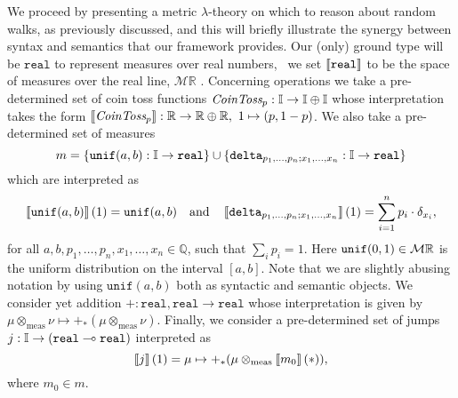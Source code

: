 We proceed by presenting a metric $\lambda$-theory on which to reason about random walks, as previously discussed, and this will briefly illustrate the synergy between syntax and semantics that our framework provides. Our (only) ground type
will be $\mathtt{real}$ to represent measures over real numbers, \ie\ we set
$\left \llbracket \mathtt{real} \right \rrbracket$ to be the space of measures over the real line, $\mathcal{M}\mathbb{R}$ .
Concerning operations we take a pre-determined set of coin toss functions $\emph{CoinToss}_p : \mathbb{I} \to \mathbb{I} \oplus \mathbb{I}$ whose interpretation takes the form $\left \llbracket \emph{CoinToss}_p \right \rrbracket:\mathbb{R} \to \mathbb{R} \oplus \mathbb{R},\ 1 \mapsto (p, 1-p)$.
We also take a pre-determined set of measures 
$$ m = \{\mathtt{unif}(a,b) : \mathbb{I} \to \mathtt{real} \} \cup \{\mathtt{delta}_{p_1,\ldots,p_n;x_1,\ldots,x_n} : \mathbb{I} \to \mathtt{real}\} $$ 
which are interpreted as 
$$ \left \llbracket \mathtt{unif}(a,b) \right \rrbracket (1) = \mathtt{unif}(a,b) \quad \text{and} \quad \left \llbracket \mathtt{delta}_{p_1,\ldots,p_n; x_1,\ldots,x_n} \right \rrbracket(1) = \sum_{i=1}^n p_i\cdot \delta_{x_i},  $$
for all $a,b, p_1,\ldots,p_n,  x_1,\ldots,x_n \in \mathbb{Q}$, such that $\sum_i p_i = 1$. Here $\mathtt{unif}(0,1) \in \mathcal{M}\mathbb{R}$ is the uniform distribution on the interval $[a,b]$.
Note that we are slightly abusing notation by using $\mathtt{unif}(a,b)$ both as syntactic and semantic objects. We consider yet addition $+ : \mathtt{real},\mathtt{real}
\to \mathtt{real}$ whose interpretation is given by $\mu \otimes_{\text{meas}} \nu \mapsto
+_\ast(\mu \otimes_{\text{meas}} \nu)$.
Finally, we consider a pre-determined set of jumps $j: \mathbb{I} \to (\mathtt{real} \multimap \mathtt{real}) $ interpreted as 
\[ 
\left \llbracket j \right \rrbracket(1)= \mu \mapsto +_\ast(\mu \otimes_{\text{meas}} \left \llbracket m_0 \right \rrbracket(*)),
\]
where $m_0 \in m$.




